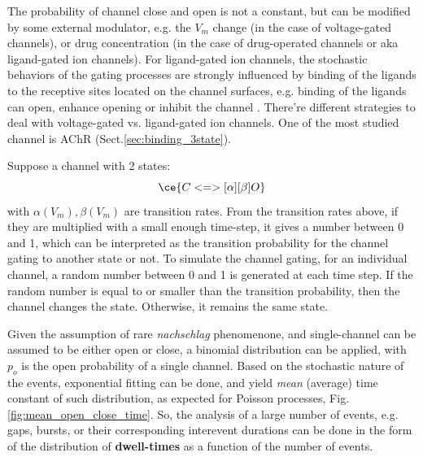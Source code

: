 The probability of channel close and open is not a constant, but can be modified
by some external modulator, e.g. the $V_m$ change (in the case of voltage-gated
channels), or drug concentration (in the case of drug-operated channels or aka
ligand-gated ion channels). For ligand-gated ion channels, the stochastic
behaviors of the gating processes are strongly influenced by binding of the
ligands to the receptive sites located on the channel surfaces, e.g.
binding of the ligands can open, enhance opening or inhibit the channel
\citep{colquhoun2002}. There're different strategies to deal with voltage-gated
vs. ligand-gated ion channels. One of the most studied channel is AChR
(Sect.\ref{sec:binding_3state}).

Suppose a channel with 2 states:
\begin{equation}
\ce{ C <=>[\alpha][\beta] O}
\end{equation}
with $\alpha(V_m), \beta(V_m)$ are transition rates. From the transition rates
above, if they are multiplied with a small enough time-step, it gives a number
between 0 and 1, which can be interpreted as the  transition probability for the
channel gating to another state or not. To simulate the channel gating, for an
individual channel, a random number between 0 and 1 is generated at each time
step. If the random number is equal to or smaller than the transition
probability, then the channel changes the state.
Otherwise, it remains the same state.

Given the assumption of rare {\it nachschlag} phenomenone, and single-channel
can be assumed to be either open or close, a binomial distribution can be
applied, with $p_o$ is the open probability of a single channel.
Based on the stochastic nature of the events, exponential fitting can be done,
and yield {\it mean} (average) time constant of such distribution, as expected
for Poisson processes, Fig.\ref{fig:mean_open_close_time}. So, the analysis of a
large number of events, e.g. gaps, bursts, or their corresponding interevent
durations can be done in the form of the distribution of {\bf dwell-times} as a
function of the number of events.


